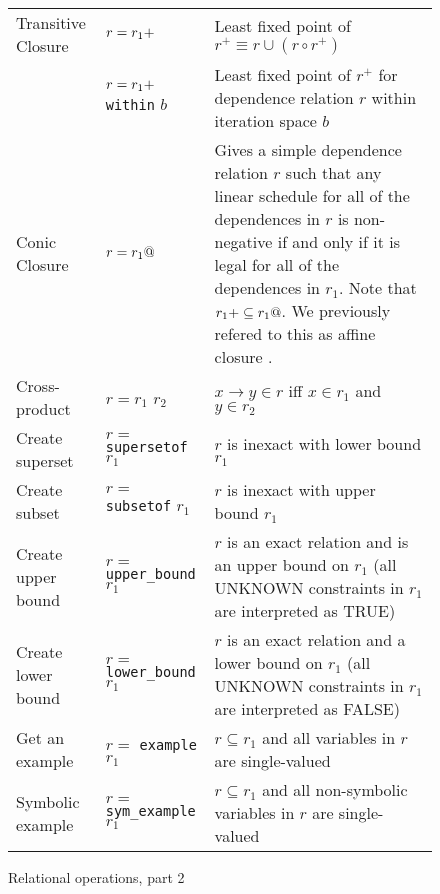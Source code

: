 \begin{figure}[tbp]
\begin{tabular}{l|l|p{3.5in}}
Transitive Closure &
$r = r_1 {\tt +}$ &
Least fixed point of $r^+ \equiv r \cup (r \circ r^+)$
\\

&
$r = r_1 {\tt +}$ {\tt within} $b$ &
Least fixed point of $r^+$ for dependence relation $r$ within iteration space $b$
\\

Conic Closure &
$r = r_1 {\tt @}$ &
Gives a simple dependence relation $r$ such that
any linear schedule for  all of the dependences in 
$r$ is non-negative if and only
if it is legal for all of the dependences in $r_1$.
Note that $r_1 {\tt +} \subseteq r_1 {\tt @}$.
We previously refered to this as affine closure \cite{uniform2.4}.
\\


Cross-product &
$r = r_1$ {\tt *} $r_2$ &
$x \rightarrow y \in r $ iff $x \in r_1$ and $y \in r_2$
\\

Create superset &
$r= $ {\tt supersetof} $r_1$ &
$r$ is inexact with lower bound $r_1$ 
\\

Create subset &
$r= $ {\tt subsetof} $r_1$ &
$r$ is inexact with upper bound $r_1$ 
\\

Create upper bound &
$r= $ {\tt upper\_bound} $r_1$ &
$r$ is an exact relation and is an upper bound on $r_1$ (all UNKNOWN
constraints in $r_1$ are interpreted as TRUE)
\\

Create lower bound &
$r= $ {\tt lower\_bound} $r_1$ &
$r$ is an exact relation and a lower bound on $r_1$ (all UNKNOWN
constraints in $r_1$ are interpreted as FALSE)
\\


Get an example &
$r= $ {\tt example} $r_1$ &
$r \subseteq r_1$ and all variables in $r$ are single-valued
\\

Symbolic example &
$r= $ {\tt sym\_example} $r_1$ &
$r \subseteq r_1$ and all non-symbolic variables in $r$ are single-valued

\end{tabular}
\caption{Relational operations, part 2}
\label{RelOps2}
\end{figure}

